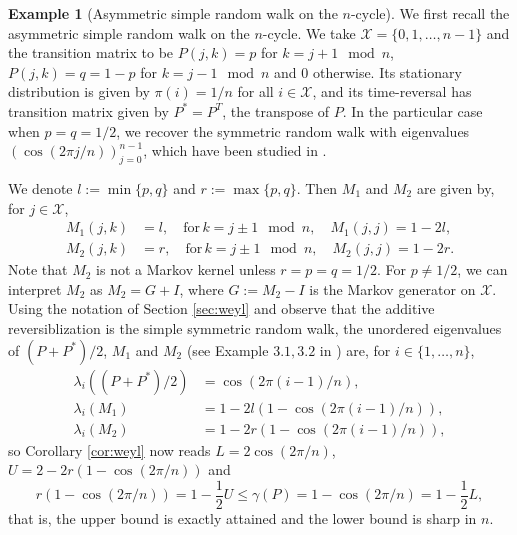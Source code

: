 \documentclass[12pt,a4]{amsart}
\numberwithin{equation}{section}
\theoremstyle{plain}
\theoremstyle{definition}
\newtheorem{example}{Example}[section]
\theoremstyle{remark}
\newcommand{\1}{\mathds{1}}
\renewcommand{\leq}{\leqslant}
\begin{document}
\begin{example}[Asymmetric simple random walk on the $n$-cycle]\label{ex:srw}
	We first recall the asymmetric simple random walk on the $n$-cycle. We take $\mathcal{X} = \{0,1,\ldots,n-1\}$ and the transition
	matrix to be $P(j,k) = p$ for $k = j + 1 \mod{n}$, $P(j,k) = q = 1 - p$ for $k = j - 1 \mod{n}$ and $0$ otherwise. Its stationary distribution is given by $\pi(i) = 1/n$ for all $i \in \mathcal{X}$, and its time-reversal has transition matrix given by $P^* = P^T$, the transpose of $P$. In the particular case when $p = q = 1/2$, we recover the symmetric random walk with eigenvalues $(\cos(2\pi j/n))_{j=0}^{n-1}$, which have been studied in \cite{LPW09, Fill91, DS91}.
	
	We denote $l := \min\{p,q\}$ and $r := \max\{p,q\}$. Then $M_1$ and $M_2$ are given by, for $j \in \mathcal{X}$,
	\begin{align*}
	M_1(j,k) &= l, \quad \mathrm{for} \, k = j \pm 1 \mod{n}, \quad
	M_1(j,j) = 1-2l, \\
	M_2(j,k) &= r, \quad \mathrm{for} \, k = j \pm 1 \mod{n}, \quad
	M_2(j,j) = 1-2r.
	\end{align*}
	Note that $M_2$ is not a Markov kernel unless $r = p = q = 1/2$. For $p \neq 1/2$, we can interpret $M_2$ as $M_2 = G + I$, where $G := M_2 - I$ is the Markov generator on $\mathcal{X}$. Using the notation of Section \ref{sec:weyl} and observe that the additive reversiblization is the simple symmetric random walk, the unordered eigenvalues of $(P+P^*)/2$, $M_1$ and $M_2$ (see Example $3.1, 3.2$ in \cite{Fill91}) are, for $i \in \{1,\ldots,n\}$,
	\begin{align*}
	\lambda_i((P+P^*)/2) &= \cos(2\pi (i-1)/n), \\
	\lambda_i(M_1) &= 1 - 2l (1-\cos(2\pi (i-1)/n)), \\
	\lambda_i(M_2) &= 1 - 2r (1-\cos(2\pi (i-1)/n)),
	\end{align*}
	so Corollary \ref{cor:weyl} now reads $L=2\cos(2\pi/n)$, $U = 2 - 2r (1-\cos(2\pi/n))$ and
	$$r(1 - \cos (2\pi/n)) = 1 - \dfrac{1}{2}U \leq \gamma(P) = 1 - \cos (2\pi/n) = 1 - \dfrac{1}{2}L,$$
	that is, the upper bound is exactly attained and the lower bound is sharp in $n$.
\end{example}
\end{document}
